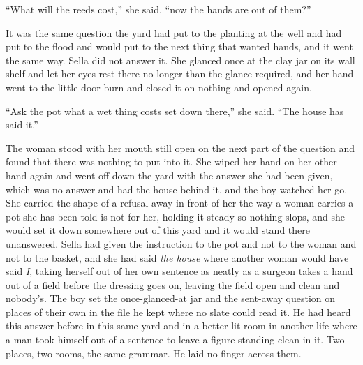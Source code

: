 “What will the reeds cost,” she said, “now the hands are out of them?”

It was the same question the yard had put to the planting at the well and had put to the flood and would put to the next thing that wanted hands, and it went the same way. Sella did not answer it. She glanced once at the clay jar on its wall shelf and let her eyes rest there no longer than the glance required, and her hand went to the little-door burn and closed it on nothing and opened again.

“Ask the pot what a wet thing costs set down there,” she said. “The house has said it.”

The woman stood with her mouth still open on the next part of the question and found that there was nothing to put into it. She wiped her hand on her other hand again and went off down the yard with the answer she had been given, which was no answer and had the house behind it, and the boy watched her go. She carried the shape of a refusal away in front of her the way a woman carries a pot she has been told is not for her, holding it steady so nothing slops, and she would set it down somewhere out of this yard and it would stand there unanswered. Sella had given the instruction to the pot and not to the woman and not to the basket, and she had said \emph{the house} where another woman would have said \emph{I}, taking herself out of her own sentence as neatly as a surgeon takes a hand out of a field before the dressing goes on, leaving the field open and clean and nobody's. The boy set the once-glanced-at jar and the sent-away question on places of their own in the file he kept where no slate could read it. He had heard this answer before in this same yard and in a better-lit room in another life where a man took himself out of a sentence to leave a figure standing clean in it. Two places, two rooms, the same grammar. He laid no finger across them.

